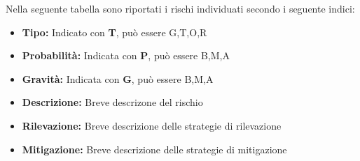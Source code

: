 Nella seguente tabella sono riportati i rischi individuati secondo i seguente indici:
\begin{itemize}
    \item \textbf{Tipo: } Indicato con \textbf{T}, può essere G,T,O,R
    \item \textbf{Probabilità: } Indicata con \textbf{P}, può essere B,M,A
    \item \textbf{Gravità: }Indicata con \textbf{G}, può essere B,M,A
    \item \textbf{Descrizione: }Breve descrizone del rischio
    \item \textbf{Rilevazione: }Breve descrizione delle strategie di rilevazione
    \item \textbf{Mitigazione: }Breve descrizione delle strategie di mitigazione
\end{itemize}

